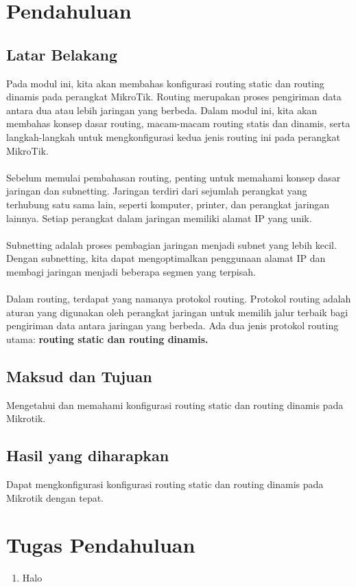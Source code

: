 \section{Pendahuluan}
\subsection{Latar Belakang}
Pada modul ini, kita akan membahas konfigurasi routing static dan routing dinamis pada perangkat
MikroTik. Routing merupakan proses pengiriman data antara dua atau lebih jaringan yang berbeda.
Dalam modul ini, kita akan membahas konsep dasar routing, macam-macam routing statis dan
dinamis, serta langkah-langkah untuk mengkonfigurasi kedua jenis routing ini pada perangkat
MikroTik.\\\\
Sebelum memulai pembahasan routing, penting untuk memahami konsep dasar jaringan dan
subnetting. Jaringan terdiri dari sejumlah perangkat yang terhubung satu sama lain, seperti komputer,
printer, dan perangkat jaringan lainnya. Setiap perangkat dalam jaringan memiliki alamat IP yang
unik.\\\\
Subnetting adalah proses pembagian jaringan menjadi subnet yang lebih kecil. Dengan subnetting, kita
dapat mengoptimalkan penggunaan alamat IP dan membagi jaringan menjadi beberapa segmen yang
terpisah.\\\\
Dalam routing, terdapat yang namanya protokol routing. Protokol routing adalah aturan yang
digunakan oleh perangkat jaringan untuk memilih jalur terbaik bagi pengiriman data antara jaringan
yang berbeda. Ada dua jenis protokol routing utama: \textbf{routing static dan routing dinamis.}

\subsection{Maksud dan Tujuan}
Mengetahui dan memahami konfigurasi routing static dan routing dinamis pada Mikrotik.

\subsection{Hasil yang diharapkan}
Dapat mengkonfigurasi konfigurasi routing static dan routing dinamis pada Mikrotik dengan
tepat.

\section{Tugas Pendahuluan}
\begin{enumerate}
	\item Halo
\end{enumerate}

